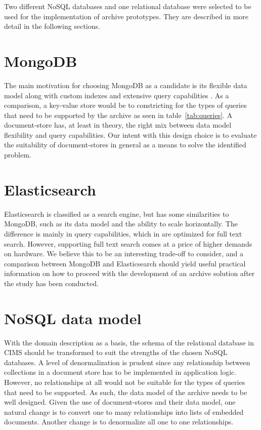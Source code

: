 Two different NoSQL databases and one relational database were selected to be used for the implementation of archive prototypes. They are described in more detail in the following sections.

\section{MongoDB}
The main motivation for choosing MongoDB as a candidate is its flexible data model along with custom indexes and extensive query capabilities \cite{Catell}. As a comparison, a key-value store would be to constricting for the types of queries that need to be supported by the archive as seen in table~\ref{tab:queries}. A document-store has, at least in theory, the right mix between data model flexibility and query capabilities. Our intent with this design choice is to evaluate the suitability of document-stores in general as a means to solve the identified problem. 

\section{Elasticsearch}
Elasticsearch is classified as a search engine, but has some similarities to MongoDB, such as its data model and the ability to scale horizontally. The difference is mainly in query capabilities, which in are optimized for full text search. However, supporting full text search comes at a price of higher demands on hardware. We believe this to be an interesting trade-off to consider, and a comparison between MongoDB and Elasticsearch should yield useful practical information on how to proceed with the development of an archive solution after the study has been conducted.

\section{NoSQL data model}
With the domain description as a basis, the schema of the relational database in CIMS should be transformed to suit the strengths of the chosen NoSQL databases. A level of denormalization is prudent since any relationship between collections in a document store has to be implemented in application logic. However, no relationships at all would not be suitable for the types of queries that need to be supported. As such, the data model of the archive needs to be well designed. Given the use of document-stores and their data model, one natural change is to convert one to many relationships into lists of embedded documents. Another change is to denormalize all one to one relationships.

